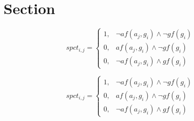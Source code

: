 \documentclass[a4paper]{article}
\begin{document}
\section{Section}

\begin{equation}
spct_{i,j} =
\begin{cases}
1, & \text{$\neg af(a_j,g_i) \wedge \neg gf(g_i)$}\\
0, & \text{$af(a_j,g_i) \wedge \neg gf(g_i)$}\\
0, & \text{$\neg af(a_j,g_i) \wedge gf(g_i)$}
\end{cases}
\end{equation}

\begin{equation}
spct_{i,j} =
\begin{cases}
1, & \text{$\neg af(a_j,g_i) \wedge \neg gf(g_i)$}\\
0, & \text{$af(a_j,g_i) \wedge \neg gf(g_i)$}\\
0, & \text{$\neg af(a_j,g_i) \wedge gf(g_i)$}
\end{cases}
\end{equation}
\end{document}
